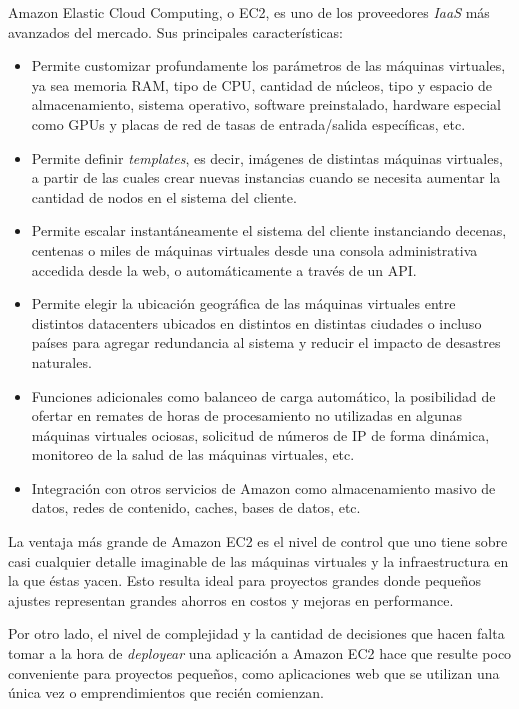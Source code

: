 \documentclass[a4paper,10pt,twoside]{article}
\begin{document}
Amazon Elastic Cloud Computing, o EC2, es uno de los proveedores \emph{IaaS} más avanzados del mercado. Sus principales características:

\begin{itemize}
	\item Permite customizar profundamente los parámetros de las máquinas virtuales, ya sea memoria RAM, tipo de CPU, cantidad de núcleos, tipo y espacio de almacenamiento, sistema operativo, software preinstalado, hardware especial como GPUs y placas de red de tasas de entrada/salida específicas, etc.

	\item Permite definir \emph{templates}, es decir, imágenes de distintas máquinas virtuales, a partir de las cuales crear nuevas instancias cuando se necesita aumentar la cantidad de nodos en el sistema del cliente.

	\item Permite escalar instantáneamente el sistema del cliente instanciando decenas, centenas o miles de máquinas virtuales desde una consola administrativa accedida desde la web, o automáticamente a través de un API.

	\item Permite elegir la ubicación geográfica de las máquinas virtuales entre distintos datacenters ubicados en distintos en distintas ciudades o incluso países para agregar redundancia al sistema y reducir el impacto de desastres naturales.

	\item Funciones adicionales como balanceo de carga automático, la posibilidad de ofertar en remates de horas de procesamiento no utilizadas en algunas máquinas virtuales ociosas, solicitud de números de IP de forma dinámica, monitoreo de la salud de las máquinas virtuales, etc.

	\item Integración con otros servicios de Amazon como almacenamiento masivo de datos, redes de contenido, caches, bases de datos, etc.
\end{itemize}

La ventaja más grande de Amazon EC2 es el nivel de control que uno tiene sobre casi cualquier detalle imaginable de las máquinas virtuales y la infraestructura en la que éstas yacen. Esto resulta ideal para proyectos grandes donde pequeños ajustes representan grandes ahorros en costos y mejoras en performance.

Por otro lado, el nivel de complejidad y la cantidad de decisiones que hacen falta tomar a la hora de \emph{deployear} una aplicación a Amazon EC2 hace que resulte poco conveniente para proyectos pequeños, como aplicaciones web que se utilizan una única vez o emprendimientos que recién comienzan.
\end{document}
